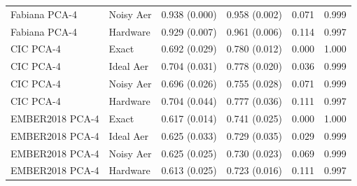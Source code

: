 \begin{longtable}{llrrrr}
Fabiana PCA-4 & Noisy Aer & 0.938 (0.000) & 0.958 (0.002) & 0.071 & 0.999 \\
Fabiana PCA-4 & Hardware & 0.929 (0.007) & 0.961 (0.006) & 0.114 & 0.997 \\
CIC PCA-4 & Exact & 0.692 (0.029) & 0.780 (0.012) & 0.000 & 1.000 \\
CIC PCA-4 & Ideal Aer & 0.704 (0.031) & 0.778 (0.020) & 0.036 & 0.999 \\
CIC PCA-4 & Noisy Aer & 0.696 (0.026) & 0.755 (0.028) & 0.071 & 0.999 \\
CIC PCA-4 & Hardware & 0.704 (0.044) & 0.777 (0.036) & 0.111 & 0.997 \\
EMBER2018 PCA-4 & Exact & 0.617 (0.014) & 0.741 (0.025) & 0.000 & 1.000 \\
EMBER2018 PCA-4 & Ideal Aer & 0.625 (0.033) & 0.729 (0.035) & 0.029 & 0.999 \\
EMBER2018 PCA-4 & Noisy Aer & 0.625 (0.025) & 0.730 (0.023) & 0.069 & 0.999 \\
EMBER2018 PCA-4 & Hardware & 0.613 (0.025) & 0.723 (0.016) & 0.111 & 0.997 \\
\end{longtable}
